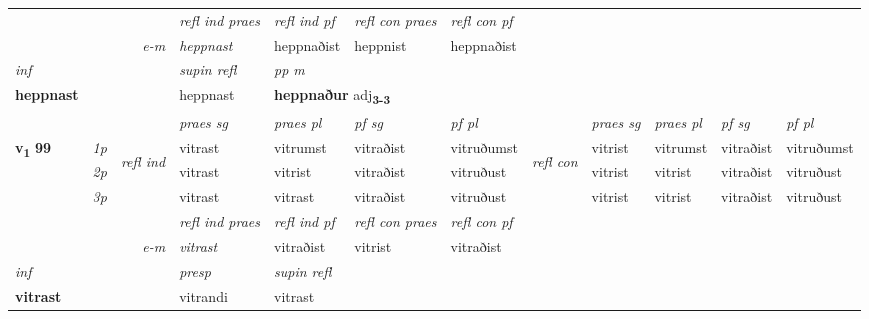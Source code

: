 \begin{longtable}[l]{X>{\footnotesize\itshape}llXXXXlXXXX}
 & && \textit{refl ind praes} & \textit{refl ind pf} & \textit{refl con praes} & \textit{refl con pf} \\*
\multicolumn{3}{r}{\textit{e-m}}& heppnast & heppnaðist & heppnist & heppnaðist \\*

\cmidrule{4-7}
   {\textit{inf}} & &       & \textit{supin refl} & \textit{pp m} \\*
  {\textbf{heppnast}} & &       & heppnast & \multicolumn{2}{l}{\textbf{heppnaður} adj\textbf{\textsubscript{3-3}}} \\*

\midrule

 & &   & \textit{praes sg}  & \textit{praes pl}    & \textit{ pf sg} & \textit{pf pl} & & \textit{praes sg}  & \textit{praes pl}    & \textit{pf sg} & \textit{pf pl }  \\ \cmidrule{4-7} \cmidrule{9-12}
 \multirow{2}{*}{{{\textbf{v{\textsubscript{1}}} \Large{\textbf{99}}}}}  & 1p & \multirow{3}{*}{\begin{turn}{90}\textit{refl ind}\end{turn}}  & vitrast & vitrumst & vitraðist & vitruðumst & \multirow{3}{*}{\begin{turn}{90}\textit{refl con}\end{turn}}  &vitrist & vitrumst & vitraðist & vitruðumst \\*
 & 2p &  & vitrast & vitrist & vitraðist & vitruðust & &vitrist & vitrist & vitraðist & vitruðust \\*
 & 3p  & & vitrast & vitrast & vitraðist & vitruðust & & vitrist & vitrist& vitraðist & vitruðust \\*
\cmidrule{4-7} \cmidrule{9-12}

 & && \textit{refl ind praes} & \textit{refl ind pf} & \textit{refl con praes} & \textit{refl con pf} \\*
\multicolumn{3}{r}{\textit{e-m}}& vitrast & vitraðist & vitrist & vitraðist \\*

\cmidrule{4-7}
   {\textit{inf}} & &     & \textit{presp}  & \textit{supin refl}  \\*
  {\textbf{vitrast}} & &     & vitrandi  & vitrast  \\*

\midrule


\end{longtable}
